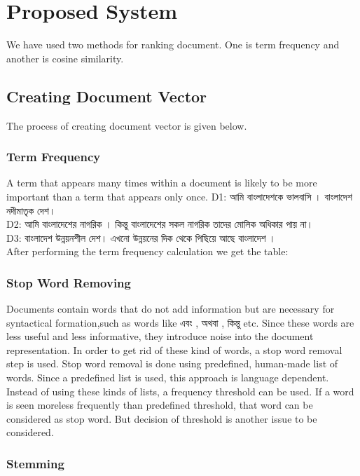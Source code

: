 \chapter{Proposed System}
\label{Ch_Chapter3}


We have used two methods for ranking document. One is term frequency and another is cosine similarity.

\section{Creating Document Vector}
The process of creating document vector is given below.

\subsection{Term Frequency}

A term that appears many times within a document is likely to be more important than a term that appears only once.
D1:   আমি  বাংলাদেশকে ভালবাসি । বাংলাদেশ নদীমাতৃক দেশ।\\ 
D2: আমি বাংলাদেশের নাগরিক । কিন্তু বাংলাদেশের সকল  নাগরিক তাদের মোলিক অধিকার পায় না। \\
D3: বাংলাদেশ উন্নয়নশীল দেশ। এখনো উন্নয়নের দিক থেকে পিছিয়ে আছে বাংলাদেশ ।  \\
After performing the term frequency calculation we get the table:


\subsection{Stop Word Removing}
Documents contain words that do not add information but are necessary for syntactical formation,such as words like এবং , অথবা , কিন্তু  etc. Since these words are less useful and less informative,  they introduce  noise into the document representation. In order to get rid of these kind of words, a stop word removal step is used.  Stop word removal is done using predefined, human-made list of words. Since a predefined list is used, this approach is language dependent. Instead of using these kinds of lists, a frequency threshold can be used. If a word is seen more\/less frequently than predefined threshold, that word can be considered as stop word. But decision of threshold is another issue to be considered.

\subsection{Stemming}

